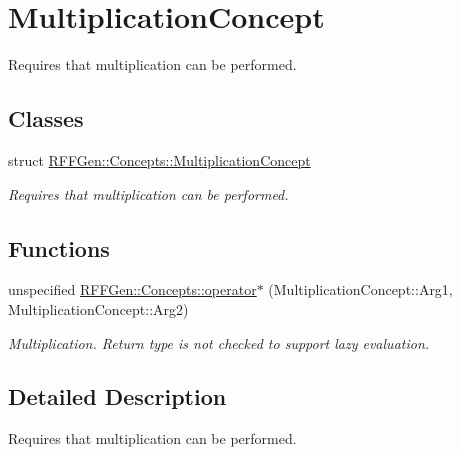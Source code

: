 \hypertarget{group__MultiplicationConcept}{\section{Multiplication\-Concept}
\label{group__MultiplicationConcept}
}


Requires that multiplication can be performed.  


\subsection*{Classes}
\begin{DoxyCompactItemize}
\item 
struct \hyperlink{structRFFGen_1_1Concepts_1_1MultiplicationConcept}{R\-F\-F\-Gen\-::\-Concepts\-::\-Multiplication\-Concept}
\begin{DoxyCompactList}\small\item\em Requires that multiplication can be performed. \end{DoxyCompactList}\end{DoxyCompactItemize}
\subsection*{Functions}
\begin{DoxyCompactItemize}
\item 
\hypertarget{group__MultiplicationConcept_gadeb3d764f7d3af3c5ff67ba9e78deb15}{unspecified \hyperlink{group__MultiplicationConcept_gadeb3d764f7d3af3c5ff67ba9e78deb15}{R\-F\-F\-Gen\-::\-Concepts\-::operator$\ast$} (Multiplication\-Concept\-::\-Arg1, Multiplication\-Concept\-::\-Arg2)}\label{group__MultiplicationConcept_gadeb3d764f7d3af3c5ff67ba9e78deb15}

\begin{DoxyCompactList}\small\item\em Multiplication. Return type is not checked to support lazy evaluation. \end{DoxyCompactList}\end{DoxyCompactItemize}


\subsection{Detailed Description}
Requires that multiplication can be performed. 